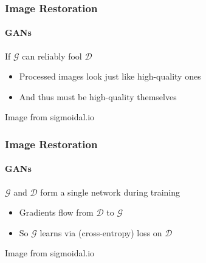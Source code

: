 \documentclass[xetex,professionalfont]{beamer}
\newcommand{\cD}{\mathcal{D}}
\newcommand{\cG}{\mathcal{G}}
\begin{document}
\begin{frame}
	\frametitle{Image Restoration}
	\framesubtitle{GANs}

	If $\cG$ can reliably fool $\cD$
	\begin{itemize}
		\item Processed images look just like high-quality ones
		\item And thus must be high-quality themselves
	\end{itemize}

	\smallskip
	\begin{center}
		{\centering Image from sigmoidal.io}
	\end{center}
\end{frame}


\begin{frame}
	\frametitle{Image Restoration}
	\framesubtitle{GANs}

	$\cG$ and $\cD$ form a single network during training
	\begin{itemize}
		\item Gradients flow from $\cD$ to $\cG$
		\item So $\cG$ learns via (cross-entropy) loss on $\cD$
	\end{itemize}

	\smallskip
	\begin{center}
		{\centering Image from sigmoidal.io}
	\end{center}
\end{frame}
\end{document}
